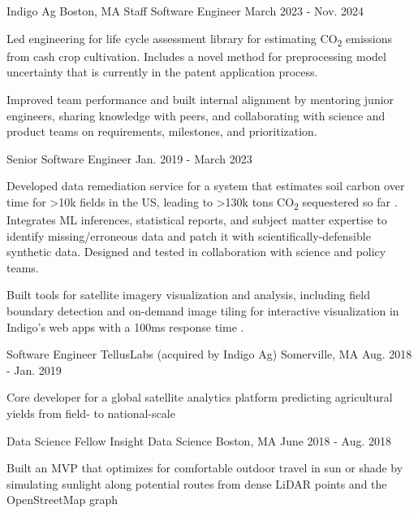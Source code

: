 \documentclass[11pt, a4paper]{awesome-cv}
\begin{document}
\begin{cventries}
  \cventrydouble
    {Indigo Ag}
    {Boston, MA}
    {Staff Software Engineer}
    {March 2023 - Nov. 2024}
    {
    \begin{cvitems}
      \item Led engineering for life cycle assessment library for estimating CO\textsubscript{2} emissions from cash crop cultivation. Includes a novel method for preprocessing model uncertainty that is currently in the patent application process.
      \item Improved team performance and built internal alignment by mentoring junior engineers, sharing knowledge with peers, and collaborating with science and product teams on requirements, milestones, and prioritization.
    \end{cvitems}
    }
    {Senior Software Engineer}
    {Jan. 2019 - March 2023}
    {
    \begin{cvitems}
      \item Developed data remediation service for a system that estimates soil carbon over time for >10k fields in the US, leading to >130k tons CO\textsubscript{2} sequestered so far . Integrates ML inferences, statistical reports, and subject matter expertise to identify missing/erroneous data and patch it with scientifically-defensible synthetic data. Designed and tested in collaboration with science and policy teams.
      \item Built tools for satellite imagery visualization and analysis, including field boundary detection  and on-demand image tiling for interactive visualization in Indigo’s web apps with a 100ms response time .
    \end{cvitems}
    }

  \cventrytight
    {Software Engineer}
    {TellusLabs (acquired by Indigo Ag)}
    {Somerville, MA}
    {Aug. 2018 - Jan. 2019}
    {
    \begin{cvitems}
      \item Core developer for a global satellite analytics platform predicting agricultural yields from field- to national-scale
    \end{cvitems}
    }

  \cventrytight
    {Data Science Fellow}
    {Insight Data Science}
    {Boston, MA}
    {June 2018 - Aug. 2018}
    {
    \begin{cvitems}
      \item Built an MVP  that optimizes for comfortable outdoor travel in sun or shade by simulating sunlight along potential routes from dense LiDAR points and the OpenStreetMap graph
    \end{cvitems}
    }


\end{cventries}
\end{document}
